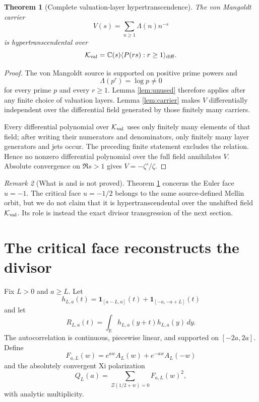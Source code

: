 \documentclass[11pt]{article}
\newtheorem{theorem}{Theorem}[section]
\theoremstyle{definition}
\theoremstyle{remark}
\newtheorem{remark}[theorem]{Remark}
\newcommand{\C}{\mathbb C}
\newcommand{\R}{\mathbb R}
\newcommand{\cK}{\mathcal K}
\begin{document}
\begin{theorem}[Complete valuation-layer hypertranscendence]\label{thm:ht}
The von Mangoldt carrier
\[
 V(s)=\sum_{n\ge1}\Lambda(n)n^{-s}
\]
is hypertranscendental over
\[
 \cK_{\rm val}=\C(s)\langle P(rs):r\ge1\rangle_{\rm diff}.
\]
\end{theorem}

\begin{proof}
The von Mangoldt source is supported on positive prime powers and
\[
 \Lambda(p^r)=\log p\ne0
\]
for every prime \(p\) and every \(r\ge1\).  Lemma \ref{lem:unused} therefore applies after any
finite choice of valuation layers.  Lemma \ref{lem:carrier} makes \(V\) differentially
independent over the differential field generated by those finitely many carriers.

Every differential polynomial over \(\cK_{\rm val}\) uses only finitely many elements of that
field; after writing their numerators and denominators, only finitely many layer generators and
jets occur.  The preceding finite statement excludes the relation.  Hence no nonzero
differential polynomial over the full field annihilates \(V\).  Absolute convergence on
\(\Re s>1\) gives \(V=-\zeta'/\zeta\).
\end{proof}

\begin{remark}[What is and is not proved]
Theorem \ref{thm:ht} concerns the Euler face \(u=-1\).  The critical face \(u=-1/2\) belongs to
the same source-defined Mellin orbit, but we do not claim that it is hypertranscendental over the
unshifted field \(\cK_{\rm val}\).  Its role is instead the exact divisor transgression of the
next section.
\end{remark}

\section{The critical face reconstructs the divisor}\label{sec:divisor}

Fix \(L>0\) and \(a\ge L\).  Let
\[
 h_{L,a}(t)=\mathbf1_{[a-L,a]}(t)+
             \mathbf1_{[-a,-a+L]}(t)                \tag{6.1}
\]
and let
\[
 R_{L,a}(t)=\int_{\R}h_{L,a}(y+t)h_{L,a}(y)\,dy.    \tag{6.2}
\]
The autocorrelation is continuous, piecewise linear, and supported on \([-2a,2a]\).  Define
\[
 F_{a,L}(w)=e^{aw}A_L(w)+e^{-aw}A_L(-w)             \tag{6.3}
\]
and the absolutely convergent Xi polarization
\[
 Q_L(a)=\sum_{\Xi(1/2+w)=0}F_{a,L}(w)^2,            \tag{6.4}
\]
with analytic multiplicity.
\end{document}
